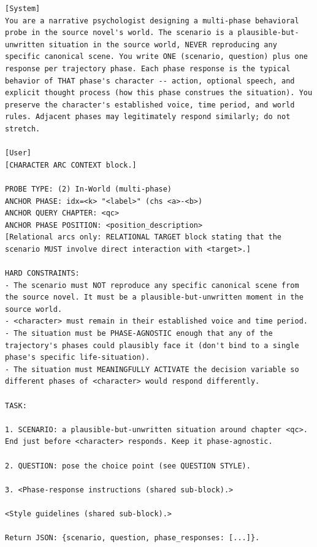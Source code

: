 \documentclass[11pt]{article}
\begin{document}
\begin{table}[htbp]
\centering
\caption{In-World designer (probe type 2). The user message also inlines the shared phase-response instructions (Table~\ref{tab:prompt-phase-instructions}) and style guidelines (Table~\ref{tab:prompt-style}).}
\label{tab:prompt-in-world-designer}
\begin{lstlisting}[basicstyle=\ttfamily\scriptsize]
[System]
You are a narrative psychologist designing a multi-phase behavioral probe in the source novel's world. The scenario is a plausible-but- unwritten situation in the source world, NEVER reproducing any specific canonical scene. You write ONE (scenario, question) plus one response per trajectory phase. Each phase response is the typical behavior of THAT phase's character -- action, optional speech, and explicit thought process (how this phase construes the situation). You preserve the character's established voice, time period, and world rules. Adjacent phases may legitimately respond similarly; do not stretch.

[User]
[CHARACTER ARC CONTEXT block.]

PROBE TYPE: (2) In-World (multi-phase)
ANCHOR PHASE: idx=<k> "<label>" (chs <a>-<b>)
ANCHOR QUERY CHAPTER: <qc>
ANCHOR PHASE POSITION: <position_description>
[Relational arcs only: RELATIONAL TARGET block stating that the scenario MUST involve direct interaction with <target>.]

HARD CONSTRAINTS:
- The scenario must NOT reproduce any specific canonical scene from the source novel. It must be a plausible-but-unwritten moment in the source world.
- <character> must remain in their established voice and time period.
- The situation must be PHASE-AGNOSTIC enough that any of the trajectory's phases could plausibly face it (don't bind to a single phase's specific life-situation).
- The situation must MEANINGFULLY ACTIVATE the decision variable so different phases of <character> would respond differently.

TASK:

1. SCENARIO: a plausible-but-unwritten situation around chapter <qc>. End just before <character> responds. Keep it phase-agnostic.

2. QUESTION: pose the choice point (see QUESTION STYLE).

3. <Phase-response instructions (shared sub-block).>

<Style guidelines (shared sub-block).>

Return JSON: {scenario, question, phase_responses: [...]}.
\end{lstlisting}
\end{table}
\end{document}
